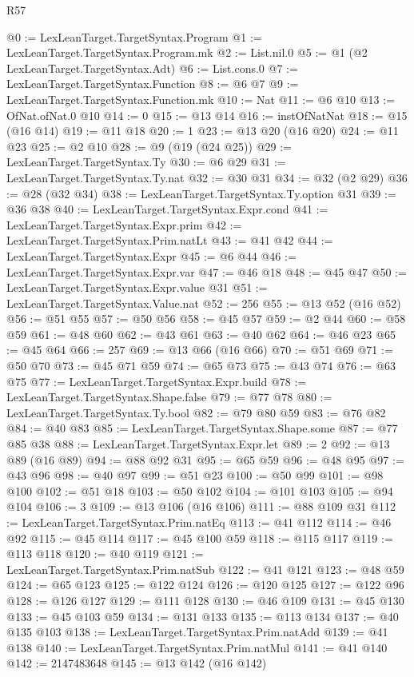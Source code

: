 \begin{lexlean}{R57}
\begin{coremodule}
@0 := LexLeanTarget.TargetSyntax.Program
@1 := LexLeanTarget.TargetSyntax.Program.mk
@2 := List.nil.{0}
@5 := @1 (@2 LexLeanTarget.TargetSyntax.Adt)
@6 := List.cons.{0}
@7 := LexLeanTarget.TargetSyntax.Function
@8 := @6 @7
@9 := LexLeanTarget.TargetSyntax.Function.mk
@10 := Nat
@11 := @6 @10
@13 := OfNat.ofNat.{0} @10
@14 := 0
@15 := @13 @14
@16 := instOfNatNat
@18 := @15 (@16 @14)
@19 := @11 @18
@20 := 1
@23 := @13 @20 (@16 @20)
@24 := @11 @23
@25 := @2 @10
@28 := @9 (@19 (@24 @25))
@29 := LexLeanTarget.TargetSyntax.Ty
@30 := @6 @29
@31 := LexLeanTarget.TargetSyntax.Ty.nat
@32 := @30 @31
@34 := @32 (@2 @29)
@36 := @28 (@32 @34)
@38 := LexLeanTarget.TargetSyntax.Ty.option @31
@39 := @36 @38
@40 := LexLeanTarget.TargetSyntax.Expr.cond
@41 := LexLeanTarget.TargetSyntax.Expr.prim
@42 := LexLeanTarget.TargetSyntax.Prim.natLt
@43 := @41 @42
@44 := LexLeanTarget.TargetSyntax.Expr
@45 := @6 @44
@46 := LexLeanTarget.TargetSyntax.Expr.var
@47 := @46 @18
@48 := @45 @47
@50 := LexLeanTarget.TargetSyntax.Expr.value @31
@51 := LexLeanTarget.TargetSyntax.Value.nat
@52 := 256
@55 := @13 @52 (@16 @52)
@56 := @51 @55
@57 := @50 @56
@58 := @45 @57
@59 := @2 @44
@60 := @58 @59
@61 := @48 @60
@62 := @43 @61
@63 := @40 @62
@64 := @46 @23
@65 := @45 @64
@66 := 257
@69 := @13 @66 (@16 @66)
@70 := @51 @69
@71 := @50 @70
@73 := @45 @71 @59
@74 := @65 @73
@75 := @43 @74
@76 := @63 @75
@77 := LexLeanTarget.TargetSyntax.Expr.build
@78 := LexLeanTarget.TargetSyntax.Shape.false
@79 := @77 @78
@80 := LexLeanTarget.TargetSyntax.Ty.bool
@82 := @79 @80 @59
@83 := @76 @82
@84 := @40 @83
@85 := LexLeanTarget.TargetSyntax.Shape.some
@87 := @77 @85 @38
@88 := LexLeanTarget.TargetSyntax.Expr.let
@89 := 2
@92 := @13 @89 (@16 @89)
@94 := @88 @92 @31
@95 := @65 @59
@96 := @48 @95
@97 := @43 @96
@98 := @40 @97
@99 := @51 @23
@100 := @50 @99
@101 := @98 @100
@102 := @51 @18
@103 := @50 @102
@104 := @101 @103
@105 := @94 @104
@106 := 3
@109 := @13 @106 (@16 @106)
@111 := @88 @109 @31
@112 := LexLeanTarget.TargetSyntax.Prim.natEq
@113 := @41 @112
@114 := @46 @92
@115 := @45 @114
@117 := @45 @100 @59
@118 := @115 @117
@119 := @113 @118
@120 := @40 @119
@121 := LexLeanTarget.TargetSyntax.Prim.natSub
@122 := @41 @121
@123 := @48 @59
@124 := @65 @123
@125 := @122 @124
@126 := @120 @125
@127 := @122 @96
@128 := @126 @127
@129 := @111 @128
@130 := @46 @109
@131 := @45 @130
@133 := @45 @103 @59
@134 := @131 @133
@135 := @113 @134
@137 := @40 @135 @103
@138 := LexLeanTarget.TargetSyntax.Prim.natAdd
@139 := @41 @138
@140 := LexLeanTarget.TargetSyntax.Prim.natMul
@141 := @41 @140
@142 := 2147483648
@145 := @13 @142 (@16 @142)

\end{coremodule}
\end{lexlean}
